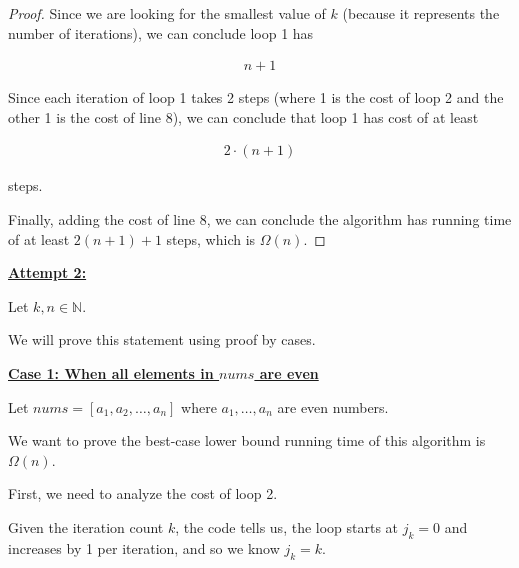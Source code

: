 \documentclass[12pt]{article}
\begin{document}
\begin{enumerate}[a.]
\begin{proof}
        \bigskip

        Since we are looking for the smallest value of $k$ (because it represents the
        number of iterations), we can conclude loop 1 has

        \begin{align}
            n+1
        \end{align}

        Since each iteration of loop 1 takes 2 steps (where 1 is the cost of loop 2 and
        the other 1 is the cost of line 8), we can conclude that loop 1 has cost of at least

        \begin{align}
            2 \cdot (n+1)
        \end{align}

        steps.

        \bigskip

        Finally, adding the cost of line 8, we can conclude the algorithm has running
        time of at least $2(n+1) + 1$ steps, which is $\Omega(n)$.
    \end{proof}

    \bigskip

    \begin{mdframed}
        \underline{\textbf{Attempt 2:}}

        \bigskip

        \color{red}
        Let $k,n \in \mathbb{N}$.

        \bigskip

        We will prove this statement using proof by cases.
        \color{black}

        \bigskip

        \underline{\textbf{Case 1: When all elements in $nums$ are even}}

        Let $nums = [a_1,a_2,\dots,a_n]$ where $a_1,\dots,a_n$ are even numbers.

        \bigskip

        We want to prove the best-case lower bound running time of this algorithm is $\Omega(n)$.

        \bigskip

        First, we need to analyze the cost of loop 2.

        \bigskip

        Given the iteration count $k$, the code tells us, the loop starts at $j_k = 0$
        and increases by 1 per iteration, and so we know $j_k = k$.


\end{mdframed}
\end{enumerate}
\end{document}
